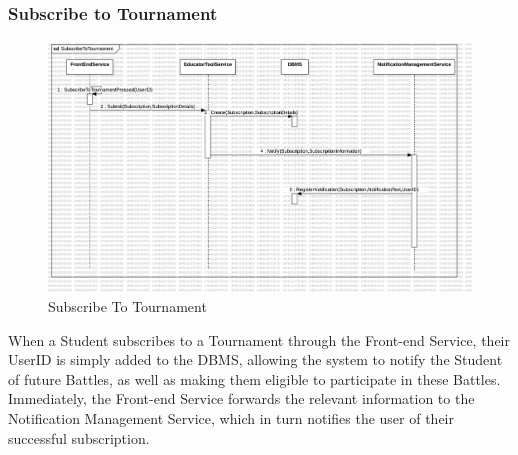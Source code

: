 \subsubsection{Subscribe to Tournament}
\begin{figure}[H]
    \centering
    \includegraphics[width=\textwidth]{Graphics/Sequence Diagrams/SubscribeToTournament.png}
    \caption{Subscribe To Tournament}
    \label{fig:SubscribeToTournament}
\end{figure}
When a Student subscribes to a Tournament through the Front-end Service, their UserID is simply added to the DBMS, allowing the system to notify the Student of future Battles, as well as making them eligible to participate in these Battles. Immediately, the Front-end Service forwards the relevant information to the Notification Management Service, which in turn notifies the user of their successful subscription. 

